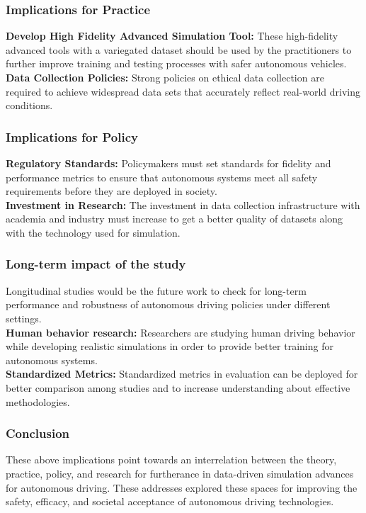 \documentclass[lettersize,journal]{IEEEtran}
\begin{document}
\subsubsection{Implications for Practice}
\textbf{Develop High Fidelity Advanced Simulation Tool:} These high-fidelity advanced tools with a variegated dataset should be used by the practitioners to further improve training and testing processes with safer autonomous vehicles.\\
\textbf{Data Collection Policies:} Strong policies on ethical data collection are required to achieve widespread data sets that accurately reflect real-world driving conditions.

\subsubsection{Implications for Policy}
\textbf{Regulatory Standards:} Policymakers must set standards for fidelity and performance metrics to ensure that autonomous systems meet all safety requirements before they are deployed in society.\\
\textbf{Investment in Research:} The investment in data collection infrastructure with academia and industry must increase to get a better quality of datasets along with the technology used for simulation.

\subsubsection{Long-term impact of the study}
Longitudinal studies would be the future work to check for long-term performance and robustness of autonomous driving policies under different settings.\\
\textbf{Human behavior research:} Researchers are studying human driving behavior while developing realistic simulations in order to provide better training for autonomous systems.\\
\textbf{Standardized Metrics:} Standardized metrics in evaluation can be deployed for better comparison among studies and to increase understanding about effective methodologies.

\subsubsection{Conclusion}
These above implications point towards an interrelation between the theory, practice, policy, and research for furtherance in data-driven simulation advances for autonomous driving. These addresses explored these spaces for improving the safety, efficacy, and societal acceptance of autonomous driving technologies.
\end{document}
